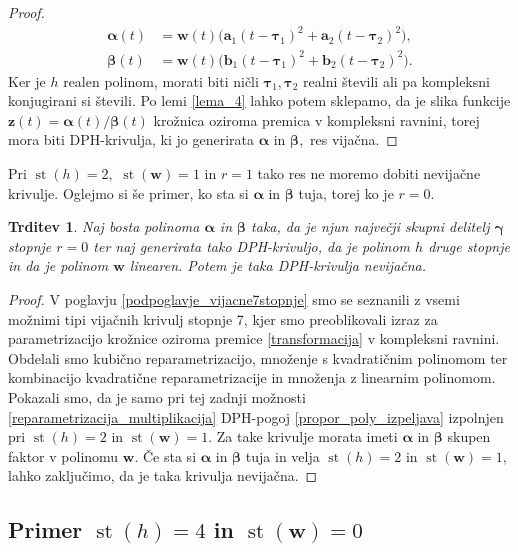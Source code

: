 \documentclass[12pt,a4paper,twoside]{article}
\theoremstyle{definition} %
\theoremstyle{plain} %
\newtheorem{trditev}[definicija]{Trditev}
\theoremstyle{primerstyle}
\numberwithin{equation}{section}  %
\newcommand{\aV}{\mathbf{a}}
\newcommand{\bV}{\mathbf{b}}
\newcommand{\wV}{\mathbf{w}}
\newcommand{\zV}{\mathbf{z}}
\newcommand{\balpha}{\boldsymbol \alpha}
\newcommand{\bbeta}{\boldsymbol \beta}
\newcommand{\bgamma}{\boldsymbol \gamma}
\newcommand{\btau}{\boldsymbol \tau}
\DeclareMathOperator{\st}{st}
\begin{document}
\begin{proof}
	\begin{align*}
		\balpha(t)&=\wV(t)\big(\aV_1(t-\btau_1)^2+\aV_2(t-\btau_2)^2\big),\\
		\bbeta(t)&=\wV(t)\big(\bV_1(t-\btau_1)^2+\bV_2(t-\btau_2)^2\big).
	\end{align*}
	Ker je $h$ realen polinom, morati biti ničli $\btau_1,\btau_2$ realni števili ali pa kompleksni konjugirani si števili. Po lemi \ref{lema_4} lahko potem sklepamo, da je slika funkcije $\zV(t)=\balpha(t)/\bbeta(t)$ krožnica oziroma premica v kompleksni ravnini, torej mora biti DPH-krivulja, ki jo generirata $\balpha$ in $\bbeta,$ res vijačna.
\end{proof}
Pri $\st(h)=2,$ $\st(\wV)=1$ in $r=1$ tako res ne moremo dobiti nevijačne krivulje. Oglejmo si še primer, ko sta si $\balpha$ in $\bbeta$ tuja, torej ko je $r=0.$
\begin{trditev}
	\label{locevanje_h2w1_trditev2}
	Naj bosta polinoma $\balpha$ in $\bbeta$ taka, da je njun največji skupni delitelj $\bgamma$ stopnje $r=0$ ter naj generirata tako DPH-krivuljo, da je polinom $h$ druge stopnje in da je polinom $\wV$ linearen. Potem je taka DPH-krivulja nevijačna.
\end{trditev}
\begin{proof}
	V poglavju \ref{podpoglavje_vijacne7stopnje} smo se seznanili z vsemi možnimi tipi vijačnih krivulj stopnje 7, kjer smo preoblikovali izraz za parametrizacijo krožnice oziroma premice \eqref{transformacija} v kompleksni ravnini. Obdelali smo kubično reparametrizacijo, množenje s kvadratičnim polinomom ter kombinacijo kvadratične reparametrizacije in množenja z linearnim polinomom. Pokazali smo, da je samo pri tej zadnji možnosti \ref{reparametrizacija_multiplikacija} DPH-pogoj \eqref{propor_poly_izpeljava} izpolnjen pri $\st(h)=2$ in $\st(\wV)=1.$ Za take krivulje morata imeti $\balpha$ in $\bbeta$ skupen faktor v polinomu $\wV.$ Če sta si $\balpha$ in $\bbeta$ tuja in velja $\st(h)=2$ in $\st(\wV)=1,$ lahko zaključimo, da je taka krivulja nevijačna.
\end{proof}

\subsection{Primer \texorpdfstring{$\st(h)=4$}{st(h)=4} in \texorpdfstring{$\st(\wV)=0$}{st(w)=0}}
\label{locevanje_h4w0}
\end{document}
